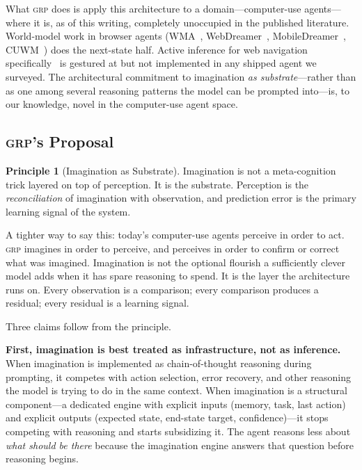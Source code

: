 \documentclass[12pt]{article}
\theoremstyle{definition}
\newtheorem{principle}{Principle}
\theoremstyle{remark}
\newcommand{\grp}{\textsc{grp}}
\begin{document}
What \grp{} does is apply this architecture to a domain---computer-use
agents---where it is, as of this writing, completely unoccupied in the
published literature. World-model work in browser agents
(WMA~\cite{wma}, WebDreamer~\cite{webdreamer},
MobileDreamer~\cite{mobiledreamer}, CUWM~\cite{cuwm}) does the
next-state half. Active inference for web navigation
specifically~\cite{efe2025} is gestured at but not implemented in any
shipped agent we surveyed. The architectural commitment to imagination
\emph{as substrate}---rather than as one among several reasoning
patterns the model can be prompted into---is, to our knowledge, novel
in the computer-use agent space.

\subsection{\grp{}'s Proposal}
\label{subsec:proposal}

\begin{principle}[Imagination as Substrate]
\label{prin:substrate}
Imagination is not a meta-cognition trick layered on top of perception.
It is the substrate. Perception is the \emph{reconciliation} of imagination
with observation, and prediction error is the primary learning signal
of the system.
\end{principle}

A tighter way to say this: today's computer-use agents perceive in order
to act. \grp{} imagines in order to perceive, and perceives in order to
confirm or correct what was imagined. Imagination is not the optional
flourish a sufficiently clever model adds when it has spare reasoning
to spend. It is the layer the architecture runs on. Every observation
is a comparison; every comparison produces a residual; every residual
is a learning signal.

Three claims follow from the principle.

\textbf{First, imagination is best treated as infrastructure, not as
inference.} When imagination is implemented as chain-of-thought
reasoning during prompting, it competes with action selection, error
recovery, and other reasoning the model is trying to do in the same
context. When imagination is a structural component---a dedicated
engine with explicit inputs (memory, task, last action) and explicit
outputs (expected state, end-state target, confidence)---it stops
competing with reasoning and starts subsidizing it. The agent reasons
less about \emph{what should be there} because the imagination engine
answers that question before reasoning begins.
\end{document}

